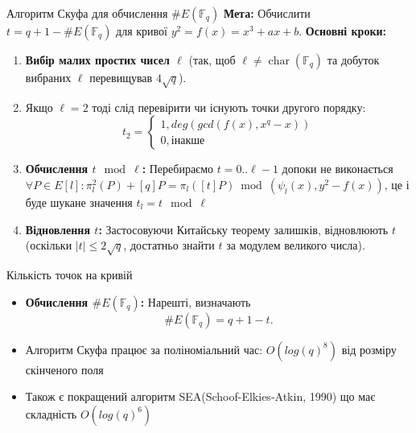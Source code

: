 \documentclass[9pt]{beamer}
\begin{document}
\begin{darkframes}
\begin{frame}{Алгоритм Скуфа для обчислення \(\#E(\mathbb{F}_q)\)}
  \textbf{Мета:} Обчислити \(t = q+1 - \#E(\mathbb{F}_q)\) для кривої $y^2=f(x)=x^3+ax+b$.
  \textbf{Основні кроки:}
  \begin{enumerate}
    \item \textbf{Вибір малих простих чисел \(\ell\)} (так, щоб \(\ell \neq \operatorname{char}(\mathbb{F}_q)\) та добуток вибраних \(\ell\) перевищував \(4\sqrt{q}\)).
    \item Якщо $\ell=2$ тоді слід перевірити чи існують точки другого порядку: $$t_2=\begin{cases}
    1,deg(gcd(f(x), x^q-x))\\
    0,\text{інакше}
    \end{cases}
    $$
    \item \textbf{Обчислення \(t \mod \ell\):}  
      Перебираємо $t=0..\ell-1$ допоки не виконається $\forall P\in E[l]: \pi_l^2(P)+[q]P = \pi_l([t]P) \bmod (\psi_l(x), y^2-f(x))$, це і буде шукане значення $t_l=t \mod \ell$
    \item \textbf{Відновлення \(t\):}  
      Застосовуючи Китайську теорему залишків, відновлюють \(t\) (оскільки \(|t| \le 2\sqrt{q}\), достатньо знайти \(t\) за модулем великого числа).
    
  \end{enumerate}
\end{frame}

\begin{frame}{Кількість точок на кривій}
  \begin{itemize}
    \item \textbf{Обчислення \(\#E(\mathbb{F}_q)\):}  
      Нарешті, визначають
      \[
      \#E(\mathbb{F}_q) = q + 1 - t.
      \]
    \item Алгоритм Скуфа працює за поліноміальний час: $O(log(q)^8)$ від розміру скінченого поля
    \item Також є покращений алгоритм SEA(Schoof-Elkies-Atkin, 1990) що має складність $O(log(q)^6)$
  \end{itemize}
  
\end{frame}



  \end{darkframes}
\end{document}
